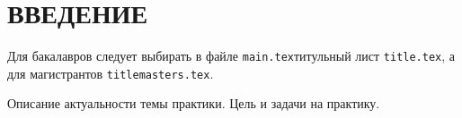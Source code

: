 \chapter*{ВВЕДЕНИЕ}

Для бакалавров следует выбирать в файле \texttt{main.tex}\linebreak титульный лист \texttt{title.tex}, а для магистрантов \texttt{titlemasters.tex}.

Описание актуальности темы практики. Цель и задачи на практику.

